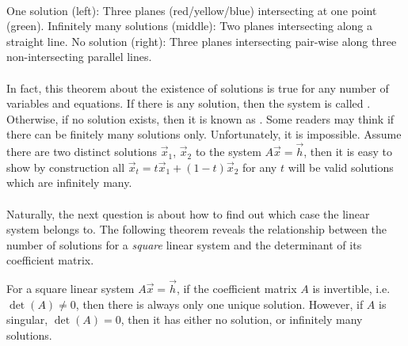     \hfill
    \begin{minipage}{0.3\textwidth}
    \end{minipage}
    \hspace*{\fill}\\
One solution (left): Three planes (red/yellow/blue) intersecting at one point (green). Infinitely many solutions (middle): Two planes intersecting along a straight line. No solution (right): Three planes intersecting pair-wise along three non-intersecting parallel lines. \\
\\
In fact, this theorem about the existence of solutions is true for any number of variables and equations. If there is any solution, then the system is called . Otherwise, if no solution exists, then it is known as . Some readers may think if there can be finitely many solutions only. Unfortunately, it is impossible. Assume there are two distinct solutions $\vec{x}_1$, $\vec{x}_2$ to the system $A\vec{x} = \vec{h}$, then it is easy to show by construction all $\vec{x}_t = t\vec{x}_1 + (1-t)\vec{x}_2$ for any $t$ will be valid solutions which are infinitely many. \\ 
\\
Naturally, the next question is about how to find out which case the linear system belongs to. The following theorem reveals the relationship between the number of solutions for a \textit{square} linear system and the determinant of its coefficient matrix.
\begin{thm}
\label{thm:sqlinsysunique}
For a square linear system $A\vec{x} = \vec{h}$, if the coefficient matrix $A$ is invertible, i.e.\ $\det(A) \neq 0$, then there is always only one unique solution. However, if $A$ is singular, $\det(A) = 0$, then it has either no solution, or infinitely many solutions.
\end{thm}
